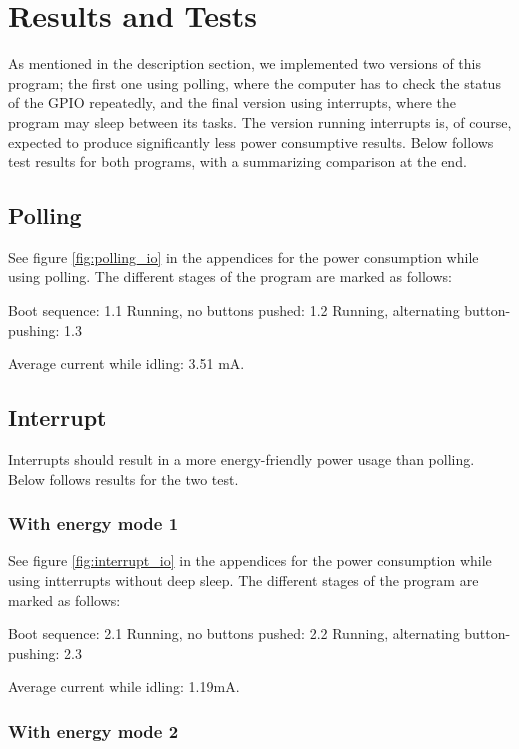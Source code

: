 \section{Results and Tests}

As mentioned in the description section, we implemented two versions of this program; the first one using polling, where the computer has to check the status of the GPIO repeatedly, and the final version using interrupts, where the program may sleep between its tasks. The version running interrupts is, of course, expected to produce significantly less power consumptive results. Below follows test results for both programs, with a summarizing comparison at the end.

\subsection{Polling}

See figure \ref{fig:polling_io} in the appendices for the power consumption while using polling. The different stages of the program are marked as follows:

Boot sequence: 1.1
Running, no buttons pushed: 1.2
Running, alternating button-pushing: 1.3

Average current while idling: 3.51 mA.

\subsection{Interrupt}

Interrupts should result in a more energy-friendly power usage than polling. Below follows results for the two test.

\subsubsection{With energy mode 1}

See figure \ref{fig:interrupt_io} in the appendices for the power consumption while using intterrupts without deep sleep. The different stages of the program are marked as follows:

Boot sequence: 2.1
Running, no buttons pushed: 2.2
Running, alternating button-pushing: 2.3

Average current while idling: 1.19mA.

\subsubsection{With energy mode 2}

